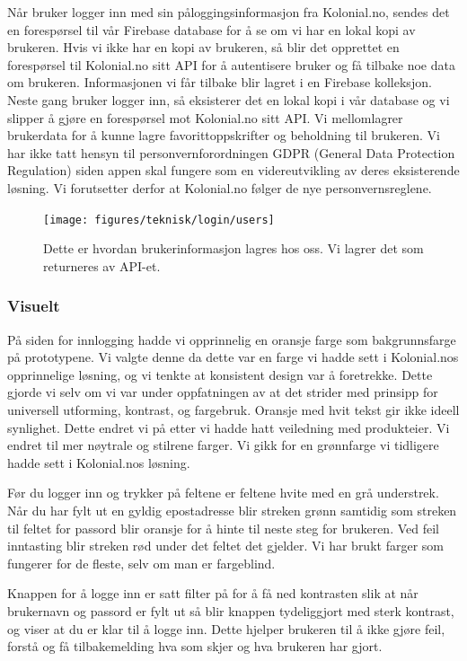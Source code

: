 Når bruker logger inn med sin påloggingsinformasjon fra Kolonial.no, sendes det en forespørsel til vår Firebase database for å se om vi har en lokal kopi av brukeren. Hvis vi ikke har en kopi av brukeren, så blir det opprettet en forespørsel til Kolonial.no sitt API for å autentisere bruker og få tilbake noe data om brukeren. Informasjonen vi får tilbake blir lagret i en Firebase kolleksjon. Neste gang bruker logger inn, så eksisterer det en lokal kopi i vår database og vi slipper å gjøre en forespørsel mot Kolonial.no sitt API. Vi mellomlagrer brukerdata for å kunne lagre favorittoppskrifter og beholdning til brukeren. Vi har ikke tatt hensyn til personvernforordningen GDPR (General Data Protection Regulation) siden appen skal fungere som en videreutvikling av deres eksisterende løsning. Vi forutsetter derfor at Kolonial.no følger de nye personvernsreglene.

\begin{figure}[H]
    \texttt{[image: figures/teknisk/login/users]}
    \caption[Innlogging 2]{Dette er hvordan brukerinformasjon lagres hos oss. Vi lagrer det som returneres av API-et.
    \label{fig:userdb}}
\end{figure}

\subsubsection{\textbf{Visuelt}}
På siden for innlogging hadde vi opprinnelig en oransje farge som bakgrunnsfarge på prototypene. Vi valgte denne da dette var en farge vi hadde sett i Kolonial.nos opprinnelige løsning, og vi tenkte at konsistent design var å foretrekke. Dette gjorde vi selv om vi var under oppfatningen av at det strider med prinsipp for universell utforming, kontrast, og fargebruk. Oransje med hvit tekst gir ikke ideell synlighet. Dette endret vi på etter vi hadde hatt veiledning med produkteier. Vi endret til mer nøytrale og stilrene farger. Vi gikk for en grønnfarge vi tidligere hadde sett i Kolonial.nos løsning. 

Før du logger inn og trykker på feltene er feltene hvite med en grå understrek. Når du har fylt ut en gyldig epostadresse blir streken grønn samtidig som streken til feltet for passord blir oransje for å hinte til neste steg for brukeren. Ved feil inntasting blir streken rød under det feltet det gjelder. Vi har brukt farger som fungerer for de fleste, selv om man er fargeblind.

Knappen for å logge inn er satt filter på for å få ned kontrasten slik at når brukernavn og passord er fylt ut så blir knappen tydeliggjort med sterk kontrast, og viser at du er klar til å logge inn. Dette hjelper brukeren til å ikke gjøre feil, forstå og få tilbakemelding hva som skjer og hva brukeren har gjort.


